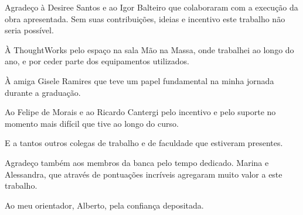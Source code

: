 \begin{agradecimento}

Agradeço à Desiree Santos e ao Igor Balteiro que colaboraram com a execução da obra apresentada. Sem suas contribuições, ideias e incentivo este trabalho não seria possível.

À ThoughtWorks pelo espaço na sala Mão na Massa, onde trabalhei ao longo do ano, e por ceder parte dos equipamentos utilizados.

À amiga Gisele Ramires que teve um papel fundamental na minha jornada durante a graduação. 

Ao Felipe de Morais e ao Ricardo Cantergi pelo incentivo e pelo suporte no momento mais difícil que tive ao longo do curso. 

E a tantos outros colegas de trabalho e de faculdade que estiveram presentes.

Agradeço também aos membros da banca pelo tempo dedicado. Marina e Alessandra, que através de pontuações incríveis agregaram muito valor a este trabalho.

Ao meu orientador, Alberto, pela confiança depositada.

\end{agradecimento}